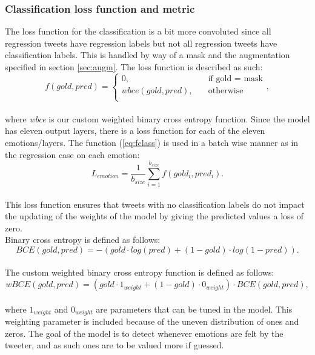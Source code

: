 \subsubsection{Classification loss function and metric}
The loss function for the classification is a bit more convoluted since all regression tweets have regression labels but not all regression tweets have classification labels. This is handled by way of a mask and the augmentation specified in section \ref{sec:augm}. The loss function is described as such:\\
\begin{equation} \label{eq:fclass}
f(gold,pred) =
     \begin{cases}
       0, &\quad\text{if gold = mask}\\
       wbce(gold,pred), &\quad\text{otherwise} \\
     \end{cases},
\end{equation}\\
where \textit{wbce} is our custom weighted binary cross entropy function. Since the model has eleven output layers, there is a loss function for each of the eleven emotions/layers. The function (\ref{eq:fclass}) is used in a batch wise manner as in the regression case on each emotion:\\
\begin{equation} \label{eq:lemotion}
L_{emotion}=\dfrac{1}{b_{size}} \sum_{i=1}^{b_{size}} f(gold_i, pred_i).
\end{equation}\\
 This loss function ensures that tweets with no classification labels do not impact the updating of the weights of the model by giving the predicted values a loss of zero.\\
Binary cross entropy is defined as follows:\\
\begin{equation}
BCE(gold,pred) = -(gold \cdot log(pred)+(1-gold) \cdot log(1-pred)).
\end{equation}\\
The custom weighted binary cross entropy function is defined as follows:\\
\begin{equation} \label{eq:wBCE}
wBCE(gold,pred) = (gold \cdot 1_{weight} + (1-gold) \cdot 0_{weight}) \cdot BCE(gold, pred),
\end{equation}\\
where $1_{weight}$ and $0_{weight}$ are parameters that can be tuned in the model. This weighting parameter is included because of the uneven distribution of ones and zeros. The goal of the model is to detect whenever emotions are felt by the tweeter, and as such ones are to be valued more if guessed.  \\ \\
